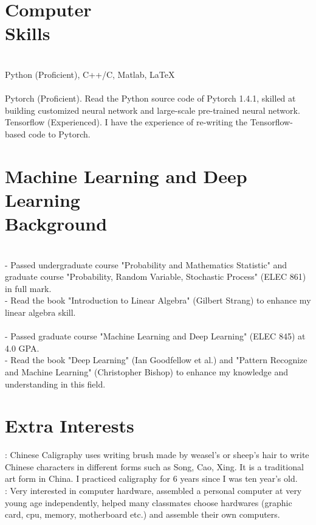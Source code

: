 \documentclass[mm]{simple_style}
\begin{document}
\begin{resume}
\begin{project}
{  }
\end{project}
\sectionline
\section{Computer\\Skills}
\\ Python (Proficient), C++/C, Matlab, \LaTeX\\
\newline
{}\\
{Pytorch (Proficient)}. Read the Python source code of Pytorch 1.4.1, skilled at building customized neural network and large-scale pre-trained neural network.\\
Tensorflow (Experienced). I have the experience of re-writing the Tensorflow-based code to Pytorch.
\\
\vspace{-2ex}
\sectionline
\section{Machine Learning and Deep Learning\\Background}
\\ 
- Passed undergraduate course "Probability and Mathematics Statistic" and graduate course "Probability, Random Variable, Stochastic Process" (ELEC 861) in full mark.\\
- Read the book "Introduction to Linear Algebra" (Gilbert Strang) to enhance my linear algebra skill.\\

\\
- Passed graduate course "Machine Learning and Deep Learning" (ELEC 845) at 4.0 GPA.\\
- Read the book "Deep Learning" (Ian Goodfellow et al.) and "Pattern Recognize and Machine Learning" (Christopher Bishop) to enhance my knowledge and understanding in this field.\\
\vspace{-2ex}
\sectionline
\section{Extra Interests}
: Chinese Caligraphy uses writing brush made by weasel's or sheep's hair to write Chinese characters in different forms such as Song, Cao, Xing. It is a traditional art form in China. I practiced caligraphy for 6 years since I was ten year's old. \\
: Very interested in computer hardware, assembled a personal computer at very young age independently, helped many classmates choose hardwares (graphic card, cpu, memory, motherboard etc.) and assemble their own computers.
\end{resume}
\end{document}
